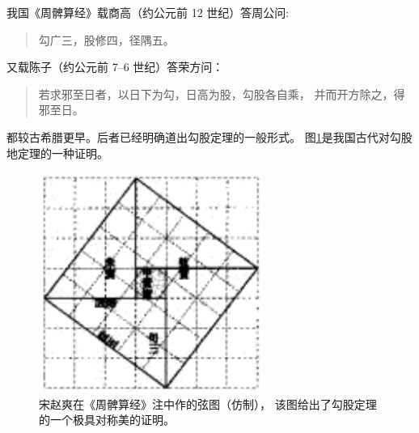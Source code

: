 \documentclass[UTF8,c5size]{ctexart}
\newenvironment{myquote}
{\begin{quote}\kaishu\zihao{-5}}
{\end{quote}}
\begin{document}
        我国《周髀算经》载商高（约公元前 12 世纪）答周公问:
        \begin{myquote}
                勾广三，股修四，径隅五。
        \end{myquote}
        又载陈子（约公元前 7--6 世纪）答荣方问：
        \begin{myquote}
                若求邪至日者，以日下为勾，日高为股，勾股各自乘，
                并而开方除之，得邪至日。
        \end{myquote}
        都较古希腊更早。后者已经明确道出勾股定理的一般形式。
        图\ref{fig:xiantu}是我国古代对勾股地定理的一种证明\cite{quanjing}。
	\begin{figure}[ht]
	        \centering
	        \includegraphics[scale=0.6]{xiantu.png}
	        \caption{宋赵爽在《周髀算经》注中作的弦图（仿制），
	                该图给出了勾股定理的一个极具对称美的证明。}
	        \label{fig:xiantu}
	\end{figure}
\end{document}
